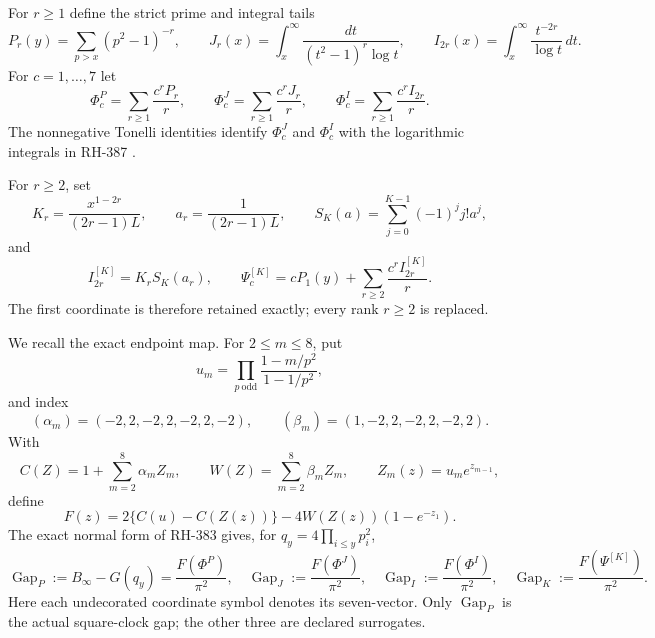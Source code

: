 \documentclass[11pt]{article}
\theoremstyle{definition}
\theoremstyle{remark}
\newcommand{\PhiP}{\Phi^{P}}
\newcommand{\PhiJ}{\Phi^{J}}
\newcommand{\PhiI}{\Phi^{I}}
\newcommand{\PsiK}{\Psi^{[K]}}
\newcommand{\GapP}{\operatorname{Gap}_{P}}
\newcommand{\GapJ}{\operatorname{Gap}_{J}}
\newcommand{\GapI}{\operatorname{Gap}_{I}}
\newcommand{\GapK}{\operatorname{Gap}_{K}}
\newcommand{\Binfty}{B_{\infty}}
\begin{document}
For $r\ge1$ define the strict prime and integral tails
\begin{equation}
 P_r(y)=\sum_{p>x}(p^2-1)^{-r},\qquad
 J_r(x)=\int_x^\infty\frac{dt}{(t^2-1)^r\log t},\qquad
 I_{2r}(x)=\int_x^\infty\frac{t^{-2r}}{\log t}\,dt.
 \label{eq:tails}
\end{equation}
For $c=1,\ldots,7$ let
\begin{equation}
 \PhiP_c=\sum_{r\ge1}\frac{c^rP_r}{r},\qquad
 \PhiJ_c=\sum_{r\ge1}\frac{c^rJ_r}{r},\qquad
 \PhiI_c=\sum_{r\ge1}\frac{c^rI_{2r}}{r}.
 \label{eq:PhiPJI}
\end{equation}
The nonnegative Tonelli identities identify $\PhiJ_c$ and $\PhiI_c$
with the logarithmic integrals in RH-387 \cite{RH387}.

For $r\ge2$, set
\begin{equation}
 K_r=\frac{x^{1-2r}}{(2r-1)L},\qquad
 a_r=\frac{1}{(2r-1)L},\qquad
 S_K(a)=\sum_{j=0}^{K-1}(-1)^j j!a^j,
 \label{eq:factorial-defs}
\end{equation}
and
\begin{equation}
 I_{2r}^{[K]}=K_rS_K(a_r),\qquad
 \PsiK_c=cP_1(y)+\sum_{r\ge2}\frac{c^rI_{2r}^{[K]}}r.
 \label{eq:Psi}
\end{equation}
The first coordinate is therefore retained exactly; every rank $r\ge2$
is replaced.

We recall the exact endpoint map.  For $2\le m\le8$, put
\[
 u_m=\prod_{p\ \mathrm{odd}}
 \frac{1-m/p^2}{1-1/p^2},
\]
and index
\[
 (\alpha_m)=(-2,2,-2,2,-2,2,-2),\qquad
 (\beta_m)=(1,-2,2,-2,2,-2,2).
\]
With
\[
 C(Z)=1+\sum_{m=2}^8\alpha_mZ_m,
 \qquad W(Z)=\sum_{m=2}^8\beta_mZ_m,
 \qquad Z_m(z)=u_me^{z_{m-1}},
\]
define
\begin{equation}
 F(z)=2\{C(u)-C(Z(z))\}
 -4W(Z(z))(1-e^{-z_1}).
 \label{eq:F}
\end{equation}
The exact normal form of RH-383 \cite{RH383} gives, for
$q_y=4\prod_{i\le y}p_i^2$,
\begin{equation}
 \GapP:=\Binfty-G(q_y)=\frac{F(\PhiP)}{\pi^2},\quad
 \GapJ:=\frac{F(\PhiJ)}{\pi^2},\quad
 \GapI:=\frac{F(\PhiI)}{\pi^2},\quad
 \GapK:=\frac{F(\PsiK)}{\pi^2}.
 \label{eq:gaps}
\end{equation}
Here each undecorated coordinate symbol denotes its seven-vector.  Only
$\GapP$ is the actual square-clock gap; the other three are declared
surrogates.
\end{document}
